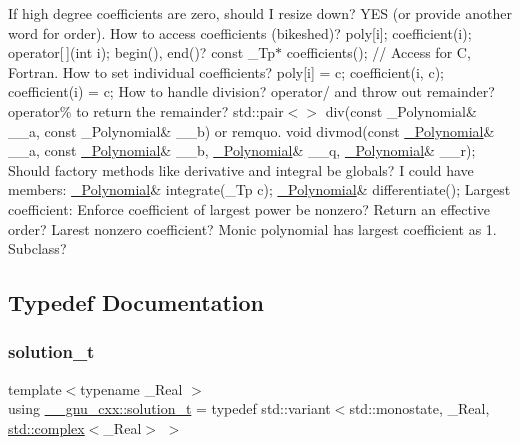 If high degree coefficients are zero, should I resize down? Y\+ES (or provide another word for order). How to access coefficients (bikeshed)? poly\mbox{[}i\mbox{]}; coefficient(i); operator\mbox{[}$\,$\mbox{]}(int i); begin(), end()? const \+\_\+\+Tp$\ast$ coefficients(); // Access for C, Fortran. How to set individual coefficients? poly\mbox{[}i\mbox{]} = c; coefficient(i, c); coefficient(i) = c; How to handle division? operator/ and throw out remainder? operator\% to return the remainder? std\+::pair$<$$>$ div(const \+\_\+\+Polynomial\& \+\_\+\+\_\+a, const \+\_\+\+Polynomial\& \+\_\+\+\_\+b) or remquo. void divmod(const \hyperlink{class____gnu__cxx_1_1__Polynomial}{\+\_\+\+Polynomial}\& \+\_\+\+\_\+a, const \hyperlink{class____gnu__cxx_1_1__Polynomial}{\+\_\+\+Polynomial}\& \+\_\+\+\_\+b, \hyperlink{class____gnu__cxx_1_1__Polynomial}{\+\_\+\+Polynomial}\& \+\_\+\+\_\+q, \hyperlink{class____gnu__cxx_1_1__Polynomial}{\+\_\+\+Polynomial}\& \+\_\+\+\_\+r); Should factory methods like derivative and integral be globals? I could have members\+: \hyperlink{class____gnu__cxx_1_1__Polynomial}{\+\_\+\+Polynomial}\& integrate(\+\_\+\+Tp c); \hyperlink{class____gnu__cxx_1_1__Polynomial}{\+\_\+\+Polynomial}\& differentiate(); Largest coefficient\+: Enforce coefficient of largest power be nonzero? Return an \textquotesingle{}effective\textquotesingle{} order? Larest nonzero coefficient? Monic polynomial has largest coefficient as 1. Subclass? 

\subsection{Typedef Documentation}
\mbox{\label{namespace____gnu__cxx_ae20ea642de50eb361074c62676b0159c}} 
\subsubsection{\texorpdfstring{solution\+\_\+t}{solution\_t}}
{\footnotesize\ttfamily template$<$typename \+\_\+\+Real $>$ \\
using \hyperlink{namespace____gnu__cxx_ae20ea642de50eb361074c62676b0159c}{\+\_\+\+\_\+gnu\+\_\+cxx\+::solution\+\_\+t} = typedef std\+::variant$<$std\+::monostate, \+\_\+\+Real, \hyperlink{classstd_1_1complex}{std\+::complex}$<$\+\_\+\+Real$>$ $>$}



